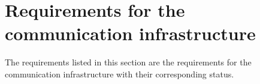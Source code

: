 
\section{Requirements for the communication infrastructure}
\label{S_requirements}

The requirements listed in this section are the
requirements for the communication infrastructure with their corresponding 
status.

